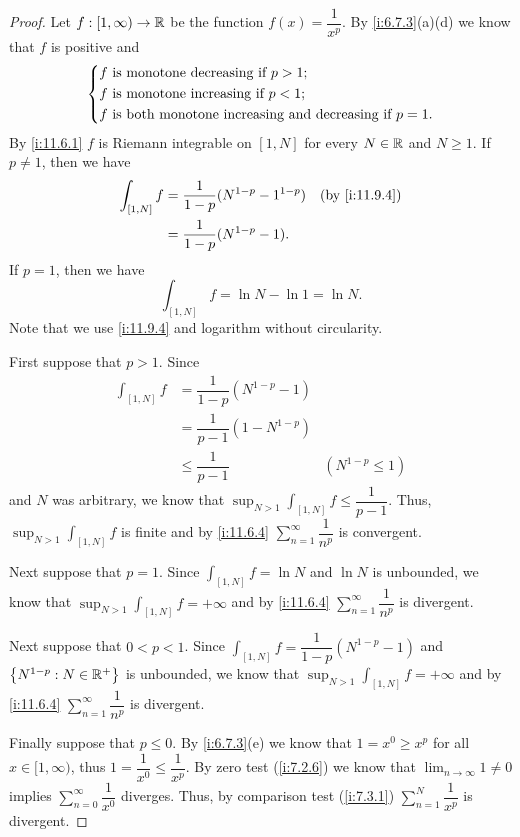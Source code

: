 \begin{proof}
  Let \(f : [1, \infty) \to \mathbb{R}\) be the function \(f(x) = \dfrac{1}{x^p}\).
  By \cref{i:6.7.3}(a)(d) we know that \(f\) is positive and
  \[
    \begin{dcases}
      f \text{ is monotone decreasing if } p > 1; \\
      f \text{ is monotone increasing if } p < 1; \\
      f \text{ is both monotone increasing and decreasing if } p = 1.
    \end{dcases}
  \]
  By \cref{i:11.6.1} \(f\) is Riemann integrable on \([1, N]\) for every \(N \in \mathbb{R}\) and \(N \geq 1\).
  If \(p \neq 1\), then we have
  \begin{align*}
    \int_{[1, N]} f & = \dfrac{1}{1 - p} (N^{1 - p} - 1^{1 - p}) &  & \by{i:11.9.4} \\
                    & = \dfrac{1}{1 - p} (N^{1 - p} - 1).
  \end{align*}
  If \(p = 1\), then we have
  \[
    \int_{[1, N]} f = \ln N - \ln 1 = \ln N.
  \]
  Note that we use \cref{i:11.9.4} and logarithm without circularity.

  First suppose that \(p > 1\).
  Since
  \begin{align*}
    \int_{[1, N]} f & = \dfrac{1}{1 - p} (N^{1 - p} - 1)                      \\
                    & = \dfrac{1}{p - 1} (1 - N^{1 - p})                      \\
                    & \leq \dfrac{1}{p - 1}              & (N^{1 - p} \leq 1)
  \end{align*}
  and \(N\) was arbitrary, we know that \(\sup_{N > 1} \int_{[1, N]} f \leq \dfrac{1}{p - 1}\).
  Thus, \(\sup_{N > 1} \int_{[1, N]} f\) is finite and by \cref{i:11.6.4} \(\sum_{n = 1}^\infty \dfrac{1}{n^p}\) is convergent.

  Next suppose that \(p = 1\).
  Since \(\int_{[1, N]} f = \ln N\) and \(\ln N\) is unbounded, we know that \(\sup_{N > 1} \int_{[1, N]} f = +\infty\) and by \cref{i:11.6.4} \(\sum_{n = 1}^\infty \dfrac{1}{n^p}\) is divergent.

  Next suppose that \(0 < p < 1\).
  Since \(\int_{[1, N]} f = \dfrac{1}{1 - p} (N^{1 - p} - 1)\) and \(\left\lbrace N^{1 - p} : N \in \mathbb{R}^+\right\rbrace\) is unbounded, we know that \(\sup_{N > 1} \int_{[1, N]} f = +\infty\) and by \cref{i:11.6.4} \(\sum_{n = 1}^\infty \dfrac{1}{n^p}\) is divergent.

  Finally suppose that \(p \leq 0\).
  By \cref{i:6.7.3}(e) we know that \(1 = x^0 \geq x^p\) for all \(x \in [1, \infty)\), thus \(1 = \dfrac{1}{x^0} \leq \dfrac{1}{x^p}\).
  By zero test (\cref{i:7.2.6}) we know that \(\lim_{n \to \infty} 1 \neq 0\) implies \(\sum_{n = 0}^\infty \dfrac{1}{x^0}\) diverges.
  Thus, by comparison test (\cref{i:7.3.1}) \(\sum_{n = 1}^N \dfrac{1}{x^p}\) is divergent.
\end{proof}

